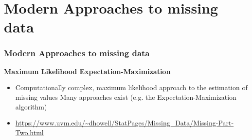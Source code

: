 \documentclass{beamer}
\begin{document}
\section{Modern Approaches to missing data}
\begin{frame}
\frametitle{Modern Approaches to missing data}

\textbf{Maximum Likelihood Expectation-Maximization}
  \begin{itemize}
  \item Computationally complex, maximum likelihood approach to the estimation of missing values Many approaches exist (e.g. the Expectation-Maximization algorithm)
  \item[] \scriptsize{\url{https://www.uvm.edu/~dhowell/StatPages/Missing_Data/Missing-Part-Two.html}}
   \end{itemize}
 
\end{frame}
\end{document}
